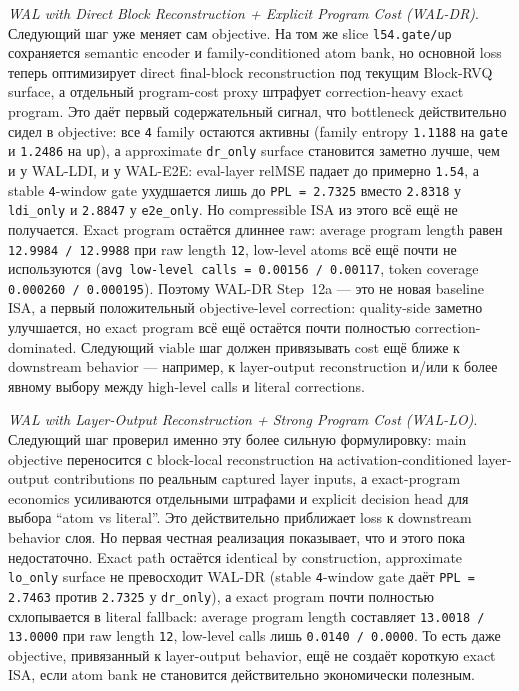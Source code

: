 \begin{itemize}[leftmargin=1.5em]
\emph{WAL with Direct Block Reconstruction + Explicit Program Cost (WAL-DR)}.
Следующий шаг уже меняет сам objective. На том же slice \texttt{l54.gate/up}
сохраняется semantic encoder и family-conditioned atom bank, но основной loss
теперь оптимизирует direct final-block reconstruction под текущим Block-RVQ
surface, а отдельный program-cost proxy штрафует correction-heavy exact
program. Это даёт первый содержательный сигнал, что bottleneck действительно
сидел в objective: все \texttt{4} family остаются активны (family entropy
\texttt{1.1188} на \texttt{gate} и \texttt{1.2486} на \texttt{up}), а
approximate \texttt{dr\_only} surface становится заметно лучше, чем и у
WAL-LDI, и у WAL-E2E: eval-layer relMSE падает до примерно \texttt{1.54}, а
stable \texttt{4}-window gate ухудшается лишь до \texttt{PPL = 2.7325} вместо
\texttt{2.8318} у \texttt{ldi\_only} и \texttt{2.8847} у
\texttt{e2e\_only}. Но compressible ISA из этого всё ещё не получается.
Exact program остаётся длиннее raw: average program length равен
\texttt{12.9984 / 12.9988} при raw length \texttt{12}, low-level atoms всё
ещё почти не используются (\texttt{avg low-level calls = 0.00156 / 0.00117},
token coverage \texttt{0.000260 / 0.000195}). Поэтому WAL-DR Step~12a --- это
не новая baseline ISA, а первый положительный objective-level correction:
quality-side заметно улучшается, но exact program всё ещё остаётся почти
полностью correction-dominated. Следующий viable шаг должен привязывать cost
ещё ближе к downstream behavior --- например, к layer-output reconstruction
и/или к более явному выбору между high-level calls и literal corrections.

\emph{WAL with Layer-Output Reconstruction + Strong Program Cost (WAL-LO)}.
Следующий шаг проверил именно эту более сильную формулировку: main objective
переносится с block-local reconstruction на activation-conditioned
layer-output contributions по реальным captured layer inputs, а exact-program
economics усиливаются отдельными штрафами и explicit decision head для выбора
``atom vs literal''. Это действительно приближает loss к downstream behavior
слоя. Но первая честная реализация показывает, что и этого пока недостаточно.
Exact path остаётся identical by construction, approximate
\texttt{lo\_only} surface не превосходит WAL-DR
(stable \texttt{4}-window gate даёт \texttt{PPL = 2.7463} против
\texttt{2.7325} у \texttt{dr\_only}), а exact program почти полностью
схлопывается в literal fallback: average program length составляет
\texttt{13.0018 / 13.0000} при raw length \texttt{12}, low-level calls лишь
\texttt{0.0140 / 0.0000}. То есть даже objective, привязанный к layer-output
behavior, ещё не создаёт короткую exact ISA, если atom bank не становится
действительно экономически полезным.


\end{itemize}
